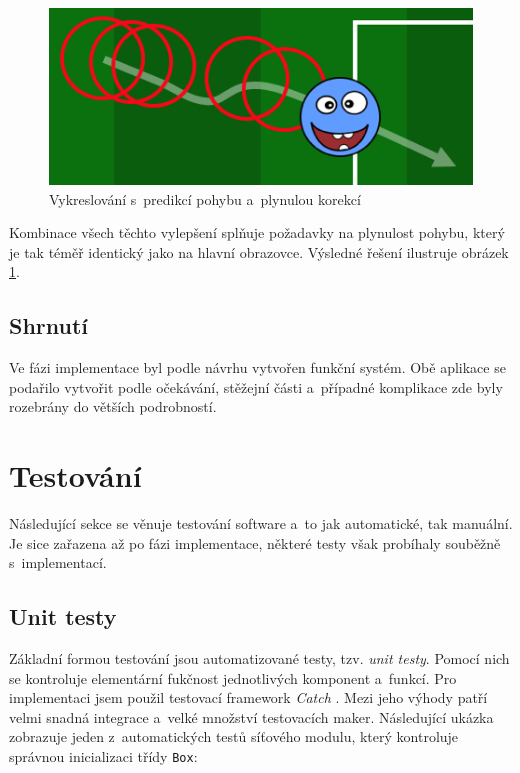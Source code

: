 \documentclass[thesis=B,czech,hidelinks]{FITthesis}[2012/06/26] %
\newcommand{\code}[1]{\texttt{#1}}
\begin{document}
\begin{figure}[h]
\center
\includegraphics[width=\textwidth]{player_rendering_3}
\caption{Vykreslování s~predikcí pohybu a~plynulou korekcí}
\label{picture:player_rendering_3}
\end{figure}

Kombinace všech těchto vylepšení splňuje požadavky na plynulost pohybu, který je tak téměř identický jako na hlavní obrazovce. Výsledné řešení ilustruje obrázek \ref{picture:player_rendering_3}.

\subsection{Shrnutí}

Ve fázi implementace byl podle návrhu vytvořen funkční systém. Obě aplikace se podařilo vytvořit podle očekávání, stěžejní části a~případné komplikace zde byly rozebrány do větších podrobností. 

\section{Testování}
\label{section:testing}

Následující sekce se věnuje testování software a~to jak automatické, tak manuální. Je sice zařazena až po fázi implementace, některé testy však probíhaly souběžně s~implementací. 

\subsection{Unit testy}

Základní formou testování jsou automatizované testy, tzv. \textit{unit testy}. Pomocí nich se kontroluje elementární fukčnost jednotlivých komponent a~funkcí. Pro implementaci jsem použil testovací framework \textit{Catch} \cite{catch}. Mezi jeho výhody patří velmi snadná integrace a~velké množství testovacích maker. Následující ukázka zobrazuje jeden z~automatických testů síťového modulu, který kontroluje správnou inicializaci třídy \code{Box}:
\end{document}
